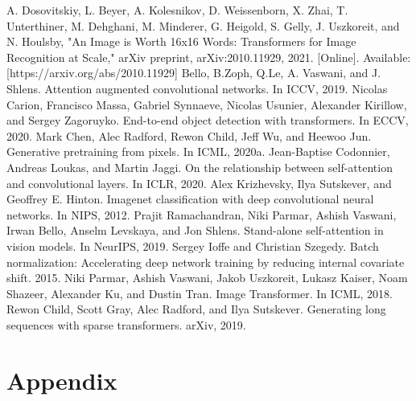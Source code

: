 \documentclass[conference]{IEEEtran}
\begin{document}
\begin{thebibliography}{00}
 A. Dosovitskiy, L. Beyer, A. Kolesnikov, D. Weissenborn, X. Zhai, T. Unterthiner, M. Dehghani, M. Minderer, G. Heigold, S. Gelly, J. Uszkoreit, and N. Houlsby, "An Image is Worth 16x16 Words: Transformers for Image Recognition at Scale," arXiv preprint, arXiv:2010.11929, 2021. [Online]. Available: [https://arxiv.org/abs/2010.11929]
 Bello, B.Zoph, Q.Le, A. Vaswani, and J. Shlens. Attention augmented convolutional networks. In ICCV, 2019.
 Nicolas Carion, Francisco Massa, Gabriel Synnaeve, Nicolas Usunier, Alexander Kirillow, and Sergey Zagoruyko. End-to-end object detection with transformers. In ECCV, 2020.
 Mark Chen, Alec Radford, Rewon Child, Jeff Wu, and Heewoo Jun. Generative pretraining from pixels. In ICML, 2020a.
 Jean-Baptise Codonnier, Andreas Loukas, and Martin Jaggi. On the relationship between self-attention and convolutional layers. In ICLR, 2020.
 Alex Krizhevsky, Ilya Sutskever, and Geoffrey E. Hinton. Imagenet classification with deep convolutional neural networks. In NIPS, 2012.
 Prajit Ramachandran, Niki Parmar, Ashish Vaswani, Irwan Bello, Anselm Levskaya, and Jon Shlens. Stand-alone self-attention in vision models. In NeurIPS, 2019.
 Sergey Ioffe and Christian Szegedy. Batch normalization: Accelerating deep network training by reducing internal covariate shift. 2015.
 Niki Parmar, Ashish Vaswani, Jakob Uszkoreit, Lukasz Kaiser, Noam Shazeer, Alexander Ku, and Dustin Tran. Image Transformer. In ICML, 2018.
 Rewon Child, Scott Gray, Alec Radford, and Ilya Sutskever. Generating long sequences with sparse transformers. arXiv, 2019.
\end{thebibliography}
\vspace{12pt}

\section{Appendix}
\end{document}
